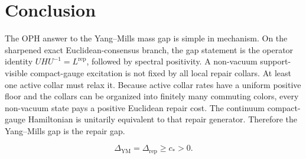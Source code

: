 \documentclass[11pt]{article}
\numberwithin{equation}{section}
\theoremstyle{remark}
\newcommand{\YM}{\mathrm{YM}}
\begin{document}
\section{Conclusion}

The OPH answer to the Yang--Mills mass gap is simple in mechanism. On the sharpened exact
Euclidean-consensus branch, the gap statement is the operator identity
\(UHU^{-1}=L^{\mathrm{rep}}\), followed by spectral positivity. A non-vacuum
support-visible compact-gauge excitation is not fixed by all local repair collars. At least one
active collar must relax it. Because active collar rates have a uniform positive floor and the
collars can be organized into finitely many commuting colors, every non-vacuum state pays a
positive Euclidean repair cost. The continuum compact-gauge Hamiltonian is unitarily equivalent
to that repair generator. Therefore the Yang--Mills gap is the repair gap.

\[
\boxed{
\Delta_{\YM}=\Delta_{\mathrm{rep}}\ge c_*>0.
}
\]
\end{document}
